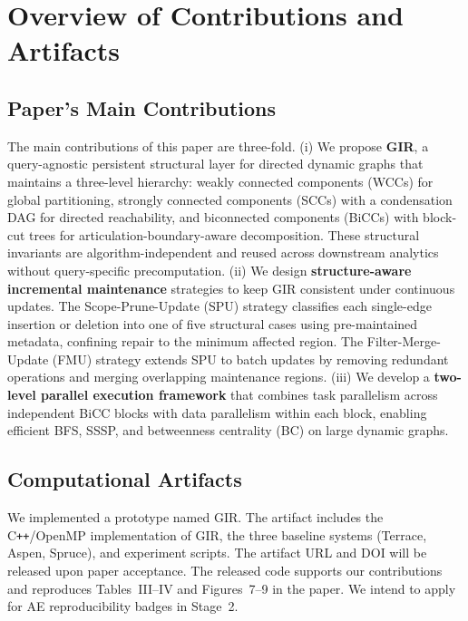 


\section*{Overview of Contributions and Artifacts}

\subsection{Paper's Main Contributions}

The main contributions of this paper are three-fold.
(i) We propose \textbf{GIR}, a query-agnostic persistent structural layer
for directed dynamic graphs that maintains a three-level hierarchy:
weakly connected components (WCCs) for global partitioning,
strongly connected components (SCCs) with a condensation DAG for
directed reachability, and biconnected components (BiCCs) with
block-cut trees for articulation-boundary-aware decomposition.
These structural invariants are algorithm-independent and reused
across downstream analytics without query-specific precomputation.
(ii) We design \textbf{structure-aware incremental maintenance} strategies
to keep GIR consistent under continuous updates.
The Scope-Prune-Update (SPU) strategy classifies each single-edge
insertion or deletion into one of five structural cases using
pre-maintained metadata, confining repair to the minimum affected region.
The Filter-Merge-Update (FMU) strategy extends SPU to batch updates
by removing redundant operations and merging overlapping maintenance regions.
(iii) We develop a \textbf{two-level parallel execution framework} that
combines task parallelism across independent BiCC blocks with
data parallelism within each block, enabling efficient BFS, SSSP,
and betweenness centrality (BC) on large dynamic graphs.

\subsection{Computational Artifacts}

We implemented a prototype named \textsc{GIR}.
The artifact includes the C\texttt{++}/OpenMP implementation of
\textsc{GIR}, the three baseline systems (Terrace, Aspen, Spruce),
and experiment scripts.
The artifact URL and DOI will be released upon paper acceptance.
The released code supports our contributions and reproduces
Tables~III--IV and Figures~7--9 in the paper.
We intend to apply for AE reproducibility badges
in Stage~2.



